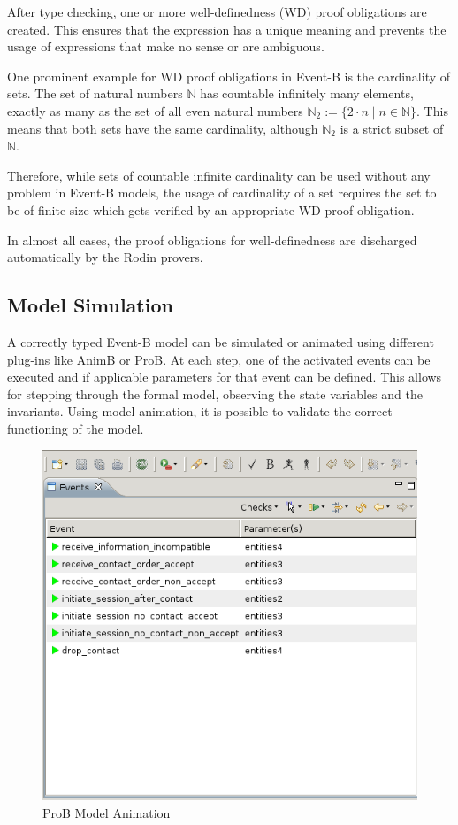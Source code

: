 \documentclass{article}
\begin{document}
After type checking, one or more well-definedness (WD) proof obligations are
created. This ensures that the expression has a unique meaning and prevents the
usage of expressions that make no sense or are ambiguous.

One prominent example for WD proof obligations in Event-B is the cardinality of
sets. The set of natural numbers $\mathbb{N}$ has countable infinitely many
elements, exactly as many as the set of all even natural numbers
$\mathbb{N}_2:=\{2\cdot n \mid n \in \mathbb{N}\}$. This means that both sets
have the same cardinality, although $\mathbb{N}_2$ is a strict subset of
$\mathbb{N}$.

Therefore, while sets of countable infinite cardinality can be used without any
problem in Event-B models, the usage of cardinality of a set requires the set to
be of finite size which gets verified by an appropriate WD proof obligation.

In almost all cases, the proof obligations for well-definedness are discharged
automatically by the Rodin provers.


\subsection{Model Simulation}
\label{sec:model-simulation}

A correctly typed Event-B model can be simulated or animated using different
plug-ins like AnimB or ProB. At each step, one of the activated events can be
executed and if applicable parameters for that event can be defined. This allows
for stepping through the formal model, observing the state variables and the
invariants. Using model animation, it is possible to validate the correct
functioning of the model.

\begin{figure}[ht]
  \centering
  \includegraphics[width=.5\textwidth]{pictures/ProBAnimation}
  \caption{ProB Model Animation}
  \label{fig:proBAnimation}
\end{figure}
\end{document}
